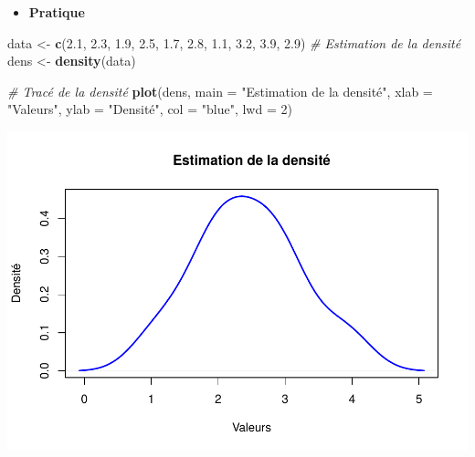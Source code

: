 \documentclass[
  12pt,
]{article}
\newenvironment{Shaded}{\begin{snugshade}}{\end{snugshade}}
\newcommand{\AttributeTok}[1]{\textcolor[rgb]{0.13,0.29,0.53}{#1}}
\newcommand{\CommentTok}[1]{\textcolor[rgb]{0.56,0.35,0.01}{\textit{#1}}}
\newcommand{\DecValTok}[1]{\textcolor[rgb]{0.00,0.00,0.81}{#1}}
\newcommand{\FloatTok}[1]{\textcolor[rgb]{0.00,0.00,0.81}{#1}}
\newcommand{\FunctionTok}[1]{\textcolor[rgb]{0.13,0.29,0.53}{\textbf{#1}}}
\newcommand{\NormalTok}[1]{#1}
\newcommand{\OtherTok}[1]{\textcolor[rgb]{0.56,0.35,0.01}{#1}}
\newcommand{\StringTok}[1]{\textcolor[rgb]{0.31,0.60,0.02}{#1}}
\providecommand{\tightlist}{%
  \setlength{\itemsep}{0pt}\setlength{\parskip}{0pt}}
\begin{document}
\begin{itemize}
\tightlist
\item
  \textbf{Pratique}
\end{itemize}

\begin{Shaded}
\begin{Highlighting}[]
\NormalTok{data }\OtherTok{\textless{}{-}} \FunctionTok{c}\NormalTok{(}\FloatTok{2.1}\NormalTok{, }\FloatTok{2.3}\NormalTok{, }\FloatTok{1.9}\NormalTok{, }\FloatTok{2.5}\NormalTok{, }\FloatTok{1.7}\NormalTok{, }\FloatTok{2.8}\NormalTok{, }\FloatTok{1.1}\NormalTok{, }\FloatTok{3.2}\NormalTok{, }\FloatTok{3.9}\NormalTok{, }\FloatTok{2.9}\NormalTok{)}
\CommentTok{\# Estimation de la densité}
\NormalTok{dens }\OtherTok{\textless{}{-}} \FunctionTok{density}\NormalTok{(data)}

\CommentTok{\# Tracé de la densité}
\FunctionTok{plot}\NormalTok{(dens, }\AttributeTok{main =} \StringTok{"Estimation de la densité"}\NormalTok{, }\AttributeTok{xlab =} \StringTok{"Valeurs"}\NormalTok{, }\AttributeTok{ylab =} \StringTok{"Densité"}\NormalTok{, }\AttributeTok{col =} \StringTok{"blue"}\NormalTok{, }\AttributeTok{lwd =} \DecValTok{2}\NormalTok{)}
\end{Highlighting}
\end{Shaded}

\includegraphics{Stat_non_para_files/figure-latex/unnamed-chunk-182-1.pdf}
\end{document}
